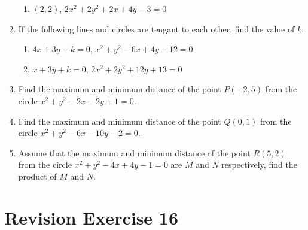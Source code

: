 \documentclass{report}
\begin{document}
\begin{multicols}{2}
\begin{enumerate}
\begin{enumerate}
                        \item $(2, 2)$, $2x^2 + 2y^2 + 2x + 4y - 3 = 0$
                  \end{enumerate}
            \item If the following lines and circles are tengant to each other, find the value of
                  $k$:
                  \begin{enumerate}
                        \item $4x + 3y - k = 0$, $x^2 + y^2 - 6x + 4y - 12 = 0$
                        \item $x + 3y + k = 0$, $2x^2 + 2y^2 + 12y + 13 = 0$
                  \end{enumerate}
            \item Find the maximum and minimum distance of the point $P(-2, 5)$ from the circle
                  $x^2 + y^2 - 2x - 2y + 1 = 0$.
            \item Find the maximum and minimum distance of the point $Q(0, 1)$ from the circle
                  $x^2 + y^2 - 6x - 10y - 2 = 0$.
            \item Assume that the maximum and minimum distance of the point $R(5, 2)$ from the
                  circle $x^2 + y^2 - 4x + 4y - 1 = 0$ are $M$ and $N$ respectively, find the
                  product of $M$ and $N$.
      \end{enumerate}

      \section{Revision Exercise 16}


\end{multicols}
\end{document}
